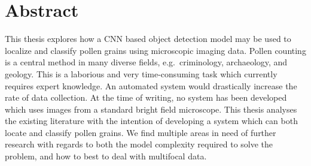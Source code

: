 \chapter*{Abstract}
This thesis explores how a CNN based object detection model may be used to localize and classify pollen grains using microscopic imaging data.
Pollen counting is a central method in many diverse fields, e.g.\ criminology, archaeology, and geology.
This is a laborious and very time-consuming task which currently requires expert knowledge.
An automated system would drastically increase the rate of data collection. 
At the time of writing, no system has been developed which uses images from a standard bright field microscope.
This thesis analyses the existing literature with the intention of developing a system which can both locate and classify pollen grains.
We find multiple areas in need of further research with regards to both the model complexity required to solve the problem, and how to best to deal with multifocal data.

